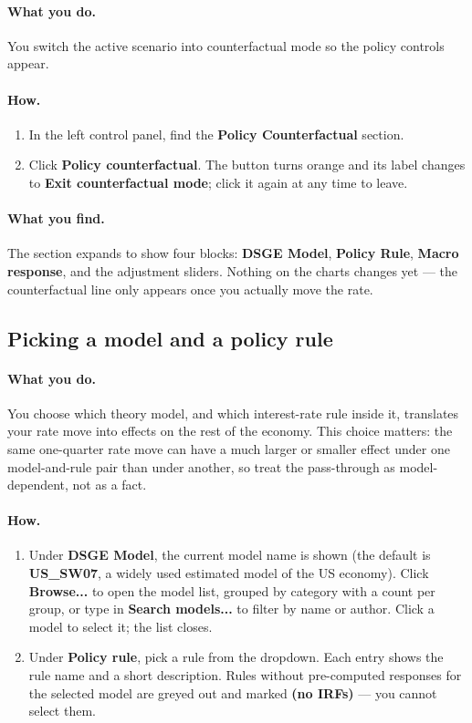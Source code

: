 \documentclass[11pt]{article}
\theoremstyle{definition}
\theoremstyle{remark}
\begin{document}
\paragraph{What you do.} You switch the active scenario into counterfactual
mode so the policy controls appear.

\paragraph{How.}
\begin{enumerate}
  \item In the left control panel, find the \textbf{Policy Counterfactual}
    section.
  \item Click \textbf{Policy counterfactual}. The button turns orange and its
    label changes to \textbf{Exit counterfactual mode}; click it again at any
    time to leave.
\end{enumerate}

\paragraph{What you find.} The section expands to show four blocks:
\textbf{DSGE Model}, \textbf{Policy Rule}, \textbf{Macro response}, and the
adjustment sliders. Nothing on the charts changes yet --- the counterfactual
line only appears once you actually move the rate.

\subsection{Picking a model and a policy rule}

\paragraph{What you do.} You choose which theory model, and which interest-rate
rule inside it, translates your rate move into effects on the rest of the
economy. This choice matters: the same one-quarter rate move can have a much
larger or smaller effect under one model-and-rule pair than under another, so
treat the pass-through as model-dependent, not as a fact.

\paragraph{How.}
\begin{enumerate}
  \item Under \textbf{DSGE Model}, the current model name is shown (the
    default is \textbf{US\_SW07}, a widely used estimated model of the US
    economy). Click \textbf{Browse...} to open the model list, grouped by
    category with a count per group, or type in \textbf{Search models...} to
    filter by name or author. Click a model to select it; the list closes.
  \item Under \textbf{Policy rule}, pick a rule from the dropdown. Each entry
    shows the rule name and a short description. Rules without pre-computed
    responses for the selected model are greyed out and marked
    \textbf{(no IRFs)} --- you cannot select them.
\end{enumerate}
\end{document}

